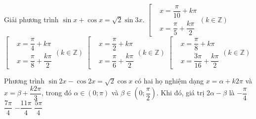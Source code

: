 	\begin{ex}%
		Giải phương trình $\sin x+\cos x=\sqrt{2}\sin 3x$.
		\choice
		{$\left[
			\begin{aligned}&x=\dfrac{\pi}{10}+k\pi\\&x=\dfrac{\pi}{5}+\dfrac{k\pi}{2}\end{aligned}\right. (k\in\mathbb{Z})$}
		{$\left[
			\begin{aligned}&x=\dfrac{\pi}{4}+k\pi\\&x=\dfrac{\pi}{8}+\dfrac{k\pi}{2}\end{aligned}\right. (k\in\mathbb{Z})$}
		{$\left[
			\begin{aligned}&x=\dfrac{\pi}{2}+k\pi\\&x=\dfrac{\pi}{6}+\dfrac{k\pi}{2}\end{aligned}\right. (k\in\mathbb{Z})$}
		{\True $\left[
			\begin{aligned}&x=\dfrac{\pi}{8}+k\pi\\&x=\dfrac{3\pi}{16}+\dfrac{k\pi}{2}\end{aligned}\right. (k\in\mathbb{Z})$}
		\loigiai{
			Ta có $\sin x+\cos x=\sqrt{2}\sin 3x\Leftrightarrow \sin\left(x+\dfrac{\pi}{4}\right)=\sin 3x\Leftrightarrow \left[
			\begin{aligned}&x=\dfrac{\pi}{8}+k\pi\\&x=\dfrac{3\pi}{16}+\dfrac{k\pi}{2}\end{aligned}\right. (k\in\mathbb{Z})$.
		}
	\end{ex}
	
	\begin{ex}%
		Phương trình $\sin  2x-\cos 2x=\sqrt{2}\cos x$ có hai họ nghiệm dạng $x=\alpha +k2\pi$ và $x=\beta +\dfrac{k2\pi}{3}$, trong đó $\alpha \in \left(0;\pi\right)$ và $\beta \in \left(0;\dfrac{\pi}{2}\right)$. Khi đó, giá trị $2\alpha -\beta$ là
		\choice
		{$-\dfrac{\pi}{4}$}
		{$\dfrac{7\pi}{4}$}
		{$-\dfrac{11\pi}{4}$}
		{\True $\dfrac{5\pi}{4}$}
	\end{ex}
	
